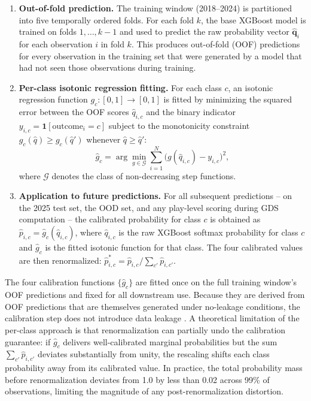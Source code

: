 \begin{enumerate}
  \item \textbf{Out-of-fold prediction.} The training window (2018--2024) is
        partitioned into five temporally ordered folds. For each fold $k$,
        the base XGBoost model is trained on folds $1, \ldots, k-1$ and used
        to predict the raw probability vector $\hat{\mathbf{q}}_i$ for each
        observation $i$ in fold $k$. This produces out-of-fold (OOF)
        predictions for every observation in the training set that were
        generated by a model that had not seen those observations during
        training.

  \item \textbf{Per-class isotonic regression fitting.} For each class $c$,
        an isotonic regression function $g_c : [0,1] \to [0,1]$ is fitted by
        minimizing the squared error between the OOF scores $\hat{q}_{i,c}$
        and the binary indicator $y_{i,c} = \mathbf{1}[\text{outcome}_i = c]$
        subject to the monotonicity constraint $g_c(\hat{q}) \geq g_c(\hat{q}')$
        whenever $\hat{q} \geq \hat{q}'$:
        \begin{equation}
          \hat{g}_c = \arg\min_{g \in \mathcal{G}} \sum_{i=1}^{N}
                    \bigl(g(\hat{q}_{i,c}) - y_{i,c}\bigr)^2,
        \end{equation}
        where $\mathcal{G}$ denotes the class of non-decreasing step functions.

  \item \textbf{Application to future predictions.} For all subsequent
        predictions -- on the 2025 test set, the OOD set, and any play-level
        scoring during GDS computation -- the calibrated probability for class
        $c$ is obtained as $\hat{p}_{i,c} = \hat{g}_c(\hat{q}_{i,c})$, where
        $\hat{q}_{i,c}$ is the raw XGBoost softmax probability for class $c$
        and $\hat{g}_c$ is the fitted isotonic function for that class. The
        four calibrated values are then renormalized:
        $\hat{p}_{i,c}^{*} = \hat{p}_{i,c} / \sum_{c'} \hat{p}_{i,c'}$.
\end{enumerate}

The four calibration functions $\{\hat{g}_c\}$ are fitted once on the full
training window's OOF predictions and fixed for all downstream use. Because
they are derived from OOF predictions that are themselves generated under
no-leakage conditions, the calibration step does not introduce data leakage
\parencite{niculescumizil2005probabilities}. A theoretical limitation of the
per-class approach is that renormalization can partially undo the calibration
guarantee: if $\hat{g}_c$ delivers well-calibrated marginal probabilities but
the sum $\sum_{c'} \hat{p}_{i,c'}$ deviates substantially from unity, the
rescaling shifts each class probability away from its calibrated value. In
practice, the total probability mass before renormalization deviates from 1.0
by less than 0.02 across 99\% of observations, limiting the magnitude of any
post-renormalization distortion.

